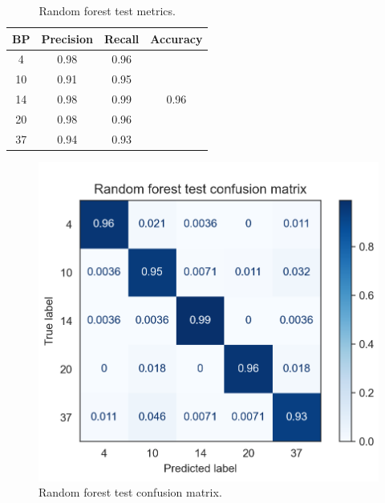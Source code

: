 \documentclass[twocolumn]{article}
\begin{document}
                  \begin{table}[H]
                        \centering
                        \caption{Random forest test metrics.}
                        \label{tab:rf}
                        \begin{tabular}{c|cc|c}
                        BP & Precision & Recall & Accuracy              \\ \hline
                        4  & 0.98      & 0.96   & \multirow{5}{*}{0.96} \\
                        10 & 0.91      & 0.95   &                       \\
                        14 & 0.98      & 0.99   &                       \\
                        20 & 0.98      & 0.96   &                       \\
                        37 & 0.94      & 0.93   &                      
                        \end{tabular}
                  \end{table}

                  \begin{figure}[H]
                        \includegraphics[width=\linewidth]{rf.png}
                        \caption{Random forest test confusion matrix.}
                        \label{fig:rf}
                  \end{figure}
\end{document}
